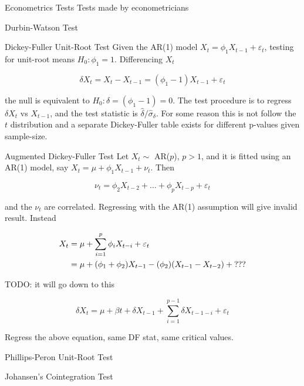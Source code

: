 \documentclass{article}
\begin{document}
\begin{section}{Econometrics Tests}
Tests made by econometricians

\begin{subsection}{Durbin-Watson Test}
\end{subsection}

\begin{subsection}{Dickey-Fuller Unit-Root Test}
Given the AR(1) model $X_t = \phi_1 X_{t-1} + \varepsilon_t$, testing
for unit-root means $H_0: \phi_1 = 1$. Differencing $X_t$

\[ \delta X_t = X_t - X_{t-1} = (\phi_1 - 1) X_{t-1} + \varepsilon_t \]

\noindent the null is equivalent to $H_0: \delta = (\phi_1 - 1) = 0$. The
test procedure is to regress $\delta X_t$ vs $X_{t-1}$, and the test
statistic is $\hat{\delta} / \hat{\sigma}_\delta$. For some reason
this is not follow the $t$ distribution and a separate Dickey-Fuller 
table exists for different p-values given sample-size. 

\begin{subsubsection}{Augmented Dickey-Fuller Test}
Let $X_t \sim $ AR($p$), $p > 1$, and it is fitted using an AR(1) model,
say $X_t = \mu + \phi_1 X_{t-1} + \nu_t$. Then

\[ \nu_t = \phi_2 X_{t-2} + \ldots + \phi_p X_{t-p} + \varepsilon_t \]

\noindent and the $\nu_t$ are correlated. Regressing with the AR(1) assumption
will give invalid result. Instead

\begin{align}
X_t &= \mu + \sum_{i=1}^p \phi_i X_{t-i} + \varepsilon_t \notag\\
   &= \mu + (\phi_1 + \phi_2) X_{t-1} - (\phi_2) (X_{t-1} - X_{t-2}) +
      \text{???} \notag
\end{align}

\noindent TODO: it will go down to this

\[ \delta X_t = \mu + \beta t + \delta X_{t-1} + \sum_{i=1}^{p-1}
     \delta X_{t-1-i} + \varepsilon_t \]

\noindent Regress the above equation, same DF stat, same critical values.
\end{subsubsection}
\end{subsection}

\begin{subsection}{Phillips-Peron Unit-Root Test}
\end{subsection}

\begin{subsection}{Johansen's Cointegration Test}
\end{subsection}
\end{section}
\end{document}
